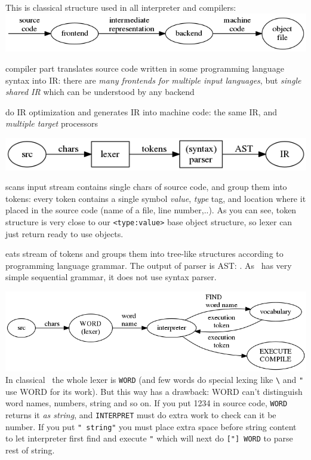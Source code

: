 \clearpage{}

This is classical structure used in all interpreter and compilers:
\noindent
\includegraphics[width=\textwidth]{img/compiler.png}
\begin{description}[nosep]
\item[frontend] compiler part translates source code written in some programming
language syntax into IR: there are \emph{many frontends for multiple input
languages}, but \emph{single shared IR} which can be understood by any backend
\item[backend] do IR optimization and generates IR into machine code: the same
IR, and \emph{multiple target} processors
\end{description}

\clearpage\noindent\includegraphics[width=\textwidth]{img/frontend.png} 
\begin{description}[nosep]
\item[lexer] scans input stream contains single chars of source code, and group
them into tokens: every token contains a single symbol \emph{value}, \emph{type}
tag, and location where it placed in the source code (name of a file, line
number,..). As you can see, token structure is very close to our
\verb|<type:value>| base object structure, so lexer can just return ready to use
objects.
\item[parser] eats stream of tokens and groups them into tree-like structures
according to programming language grammar. The output of parser is AST:
. As \F\ has very simple sequential grammar, it does
not use syntax parser.
\end{description}

\clearpage{}\label{lexer}
\noindent\includegraphics[width=\textwidth]{img/forthend.png} 
In classical \F\ the whole lexer is \verb|WORD| (and few words do special
lexing like \verb|\| and \verb|"| use WORD for its work). But this way has a
drawback: WORD can't distinguish word names, numbers, string and so on. If you
put 1234 in source code, \verb|WORD| returns it \emph{as string}, and
\verb|INTERPRET| must do extra work to check can it be number. If you put
\verb|" string"| you must place extra space before string content to let
interpreter first find and execute \verb|"| which will next do \verb|["] WORD|
to parse rest of string.

